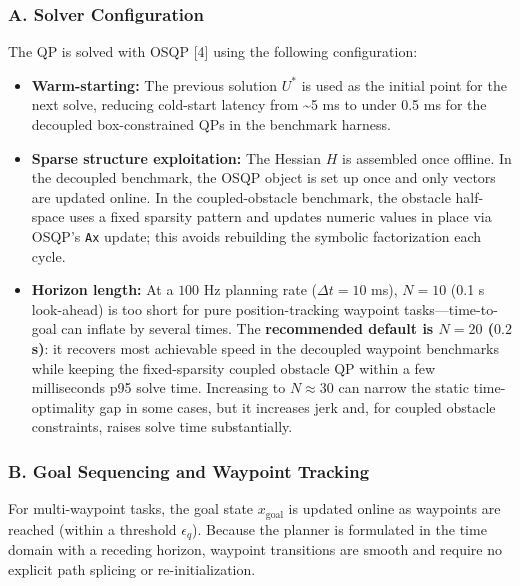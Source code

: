 \subsubsection{A. Solver Configuration}\label{a.-solver-configuration}

The QP is solved with OSQP {[}4{]} using the following configuration:

\begin{itemize}
\tightlist
\item
  \textbf{Warm-starting:} The previous solution \(U^*\) is used as the
  initial point for the next solve, reducing cold-start latency from
  \textasciitilde5 ms to under 0.5 ms for the decoupled box-constrained
  QPs in the benchmark harness.
\item
  \textbf{Sparse structure exploitation:} The Hessian \(H\) is assembled
  once offline. In the decoupled benchmark, the OSQP object is set up
  once and only vectors are updated online. In the coupled-obstacle
  benchmark, the obstacle half-space uses a fixed sparsity pattern and
  updates numeric values in place via OSQP's \texttt{Ax} update; this
  avoids rebuilding the symbolic factorization each cycle.
\item
  \textbf{Horizon length:} At a \(100\) Hz planning rate
  (\(\Delta t = 10\) ms), \(N = 10\) (0.1 s look-ahead) is too short for
  pure position-tracking waypoint tasks---time-to-goal can inflate by
  several times. The \textbf{recommended default is \(N = 20\) (\(0.2\)
  s)}: it recovers most achievable speed in the decoupled waypoint
  benchmarks while keeping the fixed-sparsity coupled obstacle QP within
  a few milliseconds p95 solve time. Increasing to \(N \approx 30\) can
  narrow the static time-optimality gap in some cases, but it increases
  jerk and, for coupled obstacle constraints, raises solve time
  substantially.
\end{itemize}

\subsubsection{B. Goal Sequencing and Waypoint
Tracking}\label{b.-goal-sequencing-and-waypoint-tracking}

For multi-waypoint tasks, the goal state \(x_{\text{goal}}\) is updated
online as waypoints are reached (within a threshold \(\epsilon_q\)).
Because the planner is formulated in the time domain with a receding
horizon, waypoint transitions are smooth and require no explicit path
splicing or re-initialization.

